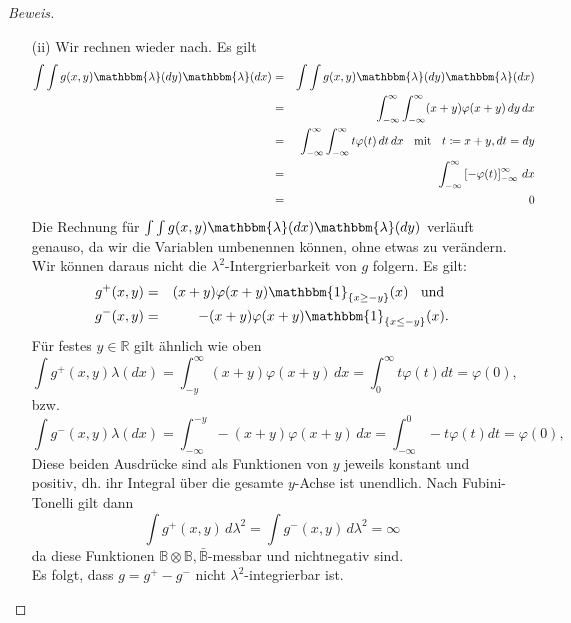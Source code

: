 \documentclass[10pt]{article}
\begin{document}
\begin{proof}[Beweis]
\begin{itemize}
\item[(ii)]
Wir rechnen wieder nach. Es gilt
\begin{eqnarray*}
\int \int g(x,y) \mathbbm{\lambda}(dy) \mathbbm{\lambda}(dx) &=& \int \int g(x,y) \mathbbm{\lambda}(dy) \mathbbm{\lambda}(dx) \\
											     &=& \int_{-\infty}^{\infty} \int_{-\infty}^{\infty} (x+y)\varphi(x+y) \, dy \,dx \\
											     &=& \int_{-\infty}^{\infty}  \int_{-\infty}^{\infty} t \varphi(t) \,dt \, dx \;\; \text{ mit } \;\; t \coloneqq x+y, dt = dy \\
											     &=& \int_{-\infty}^{\infty} \left[-\varphi(t) \right]_{-\infty}^{\infty} \,dx \\
											     &=& 0
\end{eqnarray*}
Die Rechnung für $\int \int g(x,y) \mathbbm{\lambda}(dx) \mathbbm{\lambda}(dy)$ verläuft genauso, da wir die Variablen umbenennen können, ohne etwas zu verändern. \\
Wir können daraus nicht die $\lambda^2$-Intergrierbarkeit von $g$ folgern. Es gilt:
\begin{eqnarray*}
g^+(x,y) &=&  (x+y)\varphi(x+y) \mathbbm{1}_{\{x \geq -y\}}(x) \;\; \text{ und } \\
g^-(x,y) &=&  -(x+y)\varphi(x+y) \mathbbm{1}_{\{x \leq -y\}}(x).
\end{eqnarray*}
Für festes $y \in \mathbb{R}$ gilt ähnlich wie oben
$$
\int g^+(x,y) \lambda(dx) =  \int_{-y}^{\infty} (x+y)\varphi(x+y) \, dx = \int_{0}^{\infty} t \varphi(t) dt = \varphi(0),
$$
bzw. 
$$
\int g^-(x,y) \lambda(dx) =  \int_{-\infty}^{-y} -(x+y)\varphi(x+y) \, dx = \int_{-\infty}^{0} -t \varphi(t) dt = \varphi(0),
$$
Diese beiden Ausdrücke sind als Funktionen von $y$ jeweils konstant und positiv, dh. ihr Integral über die gesamte $y$-Achse ist unendlich. Nach Fubini-Tonelli gilt dann
$$
\int g^+(x,y) \, d\lambda^2 = \int g^-(x,y) \, d\lambda^2 = \infty
$$
da diese Funktionen $\mathbb{B} \otimes \mathbb{B}, \bar{\mathbb{B}}$-messbar und nichtnegativ sind. \\
Es folgt, dass $g = g^+-g^-$ nicht $\lambda^2$-integrierbar ist.
\end{itemize}
\end{proof}
\end{document}

